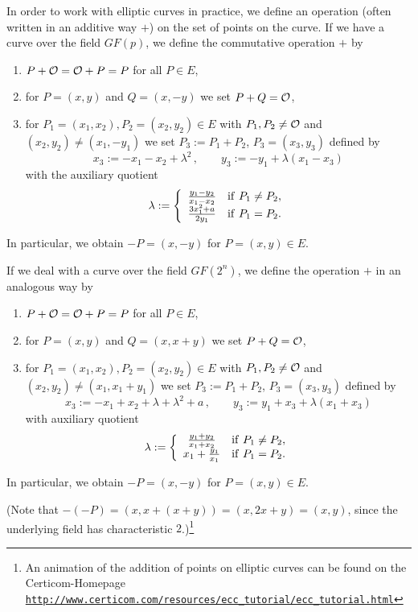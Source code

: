 In order to work with elliptic curves in practice, we define an operation (often written in an additive way $+$) on the set of points on the curve. If we have a curve over the field $GF(p)$, we define the commutative operation $+$ by
\begin{enumerate}
\item $P+{\cal O}={\cal O}+P=P$ for all $P\in E$,
\item for $P=(x,y)$ and $Q=(x,-y)$ we set $P+Q={\cal O}$,
\item for $P_1=(x_1,x_2),P_2=(x_2,y_2)\in E$ with $P_1,P_2\ne {\cal O}$ and $(x_2,y_2)\ne (x_1,-y_1)$ we set $P_3:=P_1+P_2$, $P_3=(x_3,y_3)$ defined by
$$ x_3:=-x_1-x_2+\lambda^2 \, , \qquad y_3:=-y_1+\lambda (x_1-x_3)
$$
with the auxiliary quotient
$$ \lambda:=\left\{ \begin{array}{cl} {y_1-y_2\over x_1-x_2} & {\rm if~} P_1\ne P_2, \\
                                     {3x_1^2+a\over 2y_1} & {\rm if~} P_1=P_2. \end{array} \right.
$$
\end{enumerate}
In particular, we obtain $-P=(x,-y)$ for $P=(x,y)\in E$.

If we deal with a curve over the field $GF(2^n)$, we define the operation $+$ in an analogous way by
\begin{enumerate}
\item $P+{\cal O}={\cal O}+P=P$ for all $P\in E$,
\item for $P=(x,y)$ and $Q=(x,x+y)$ we set $P+Q={\cal O}$,
\item for $P_1=(x_1,x_2),P_2=(x_2,y_2)\in E$ with $P_1,P_2\ne {\cal O}$ and $(x_2,y_2)\ne (x_1,x_1+y_1)$ we set $P_3:=P_1+P_2$, $P_3=(x_3,y_3)$ defined by
$$ x_3:=-x_1+x_2+\lambda+\lambda^2+a \, , \qquad y_3:=y_1+x_3+\lambda (x_1+x_3)
$$
with auxiliary quotient
$$ \lambda:=\left\{ \begin{array}{cl} {y_1+y_2\over x_1+x_2} & {\rm if~} P_1\ne P_2, \\
                                   x_1+{y_1\over x_1} & {\rm if~} P_1=P_2. \end{array}\right.
$$
\end{enumerate}
In particular, we obtain $-P=(x,-y)$ for $P=(x,y)\in E$.

(Note that $-(-P)=(x,x+(x+y))=(x,2x+y)=(x,y)$, since the underlying field has characteristic $2$.)\footnote{An animation of the addition of points on elliptic curves can be found on the Certicom-Homepage \\
\href{http://www.certicom.com/resources/ecc_tutorial/ecc_tutorial.html}{\texttt{http://www.certicom.com/resources/ecc\_tutorial/ecc\_tutorial.html}}}

